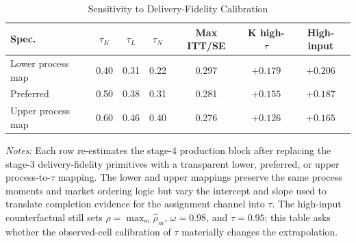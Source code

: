 \begin{table}[H]
\centering
\caption{Sensitivity to Delivery-Fidelity Calibration}
\label{tab:struct_tau_sensitivity}
\begin{threeparttable}
\footnotesize
\begin{tabular}[t]{lcccccc}
\toprule
Spec. & $\tau_K$ & $\tau_L$ & $\tau_N$ & Max ITT/SE & K high-$\tau$ & High-input \\
\midrule
Lower process map & 0.40 & 0.31 & 0.22 & 0.297 & $+0.179$ & $+0.206$ \\
Preferred & 0.50 & 0.38 & 0.31 & 0.281 & $+0.155$ & $+0.187$ \\
Upper process map & 0.60 & 0.46 & 0.40 & 0.276 & $+0.126$ & $+0.165$ \\
\bottomrule
\end{tabular}
\begin{tablenotes}
\footnotesize
\item \textit{Notes:} Each row re-estimates the stage-4 production block after replacing the stage-3 delivery-fidelity primitives with a transparent lower, preferred, or upper process-to-$\tau$ mapping. The lower and upper mappings preserve the same process moments and market ordering logic but vary the intercept and slope used to translate completion evidence for the assignment channel into $\tau$. The high-input counterfactual still sets $\rho=\max_m\hat{\rho}_m$, $\omega=0.98$, and $\tau=0.95$; this table asks whether the observed-cell calibration of $\tau$ materially changes the extrapolation.
\end{tablenotes}
\end{threeparttable}
\end{table}
